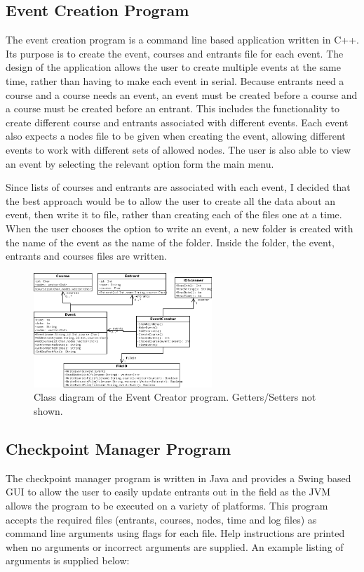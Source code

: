 \documentclass{article}
\begin{document}
\subsection{Event Creation Program}
The event creation program is a command line based application written in C++. Its purpose is to create the event, courses and entrants file for each event. The design of the application allows the user to create multiple events at the same time, rather than having to make each event in serial. Because entrants need a course and a course needs an event, an event must be created before a course and a course must be created before an entrant. This includes the functionality to create different course and entrants associated with different events. Each event also expects a nodes file to be given when creating the event, allowing different events to work with different sets of allowed nodes. The user is also able to view an event by selecting the relevant option form the main menu.

Since lists of courses and entrants are associated with each event, I decided that the best approach would be to allow the user to create all the data about an event, then write it to file, rather than creating each of the files one at a time. When the user chooses the option to write an event, a new folder is created with the name of the event as the name of the folder. Inside the folder, the event, entrants and courses files are written.


\begin{figure}[H]
\centering
\includegraphics[width=0.6\textwidth]{diagrams/event_creator.png}
\caption{Class diagram of the Event Creator program. Getters/Setters not shown.}
\label{fig:GUI-image}
\end{figure}

\subsection{Checkpoint Manager Program}
The checkpoint manager program is written in Java and provides a Swing based GUI to allow the user to easily update entrants out in the field as the JVM allows the program to be executed on a variety of platforms. This program accepts the required files (entrants, courses, nodes, time and log files) as command line arguments using flags for each file. Help instructions are printed when no arguments or incorrect arguments are supplied. An example listing of arguments is supplied below:
\end{document}
